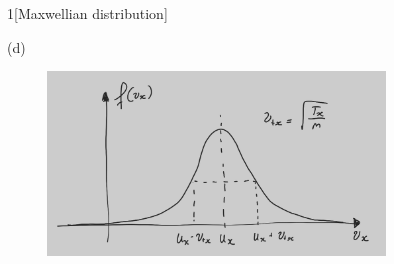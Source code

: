 \documentclass[12pt]{article}
\begin{document}
\begin{problem}{1}[Maxwellian distribution]
\begin{solution}
    (d)
    \begin{figure}[h]
        \centering
        \includegraphics[width=0.8\textwidth]{5140_hw1_p1c.jpg}
    \end{figure}
\end{solution}

\end{problem}
\end{document}
